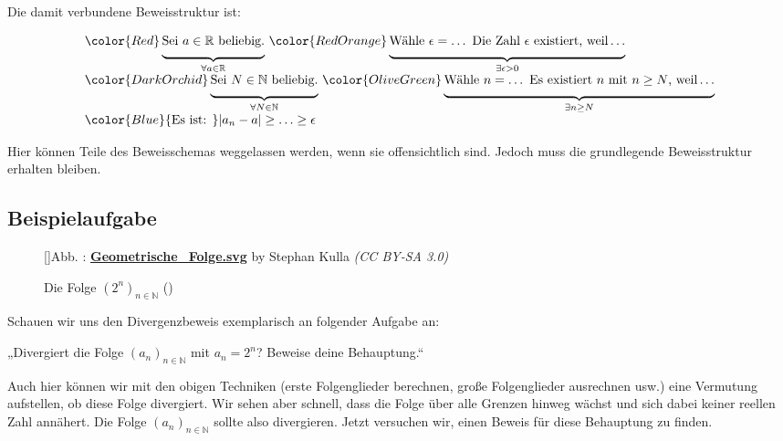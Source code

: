 \documentclass[fontsize=9pt,
               parskip=half-,
               DIV=14,
               listof=chapterentry,
               tocflat]{scrbook}
\newcounter{imagelabel}
\begin{document}
Die damit verbundene Beweisstruktur ist:

\begin{align*}
{\begin{array}{l}{\color {Red}\underbrace {{\underset {}{}}{\text{Sei }}a\in \mathbb {R} {\text{ beliebig.}}} _{\forall a\in \mathbb {R} }}\ {\color {RedOrange}\underbrace {{\underset {}{}}{\text{Wähle }}\epsilon =\ldots {\text{ Die Zahl }}\epsilon {\text{ existiert, weil}}\ldots } _{\exists \epsilon >0}}\\{\color {DarkOrchid}\underbrace {{\underset {}{}}{\text{Sei }}N\in \mathbb {N} {\text{ beliebig.}}} _{\forall N\in \mathbb {N} }}\ {\color {OliveGreen}\underbrace {{\underset {}{}}{\text{Wähle }}n=\ldots {\text{ Es existiert }}n{\text{ mit }}n\geq N{\text{, weil}}\ldots } _{\exists n\geq N}}\\{\color {Blue}{\text{Es ist: }}|a_{n}-a|\geq \ldots \geq \epsilon }\end{array}}
\end{align*}

Hier können Teile des Beweisschemas weggelassen werden, wenn sie offensichtlich sind. Jedoch muss die grundlegende Beweisstruktur erhalten bleiben.

\subsection{Beispielaufgabe}

\begin{figure}[h]
\vspace{\baselineskip}
[]{Abb. : \protect\href{https://commons.wikimedia.org/wiki/File:Geometrische_Folge.svg}{\textbf{Geometrische\allowbreak\_Folge.svg}} by Stephan Kulla \textit{(CC BY-SA 3.0)}}\centering
{}
\caption*{Die Folge $(2^{n})_{n\in \mathbb {N} }$ ()}
\end{figure}
Schauen wir uns den Divergenzbeweis exemplarisch an folgender Aufgabe an:

\begin{importantparagraph*}
„Divergiert die Folge $(a_{n})_{n\in \mathbb {N} }$ mit $a_{n}=2^{n}$? Beweise deine Behauptung.“

\end{importantparagraph*}

Auch hier können wir mit den obigen Techniken (erste Folgenglieder berechnen, große Folgenglieder ausrechnen usw.) eine Vermutung aufstellen, ob diese Folge divergiert. Wir sehen aber schnell, dass die Folge über alle Grenzen hinweg wächst und sich dabei keiner reellen Zahl annähert. Die Folge $(a_{n})_{n\in \mathbb {N} }$ sollte also divergieren. Jetzt versuchen wir, einen Beweis für diese Behauptung zu finden.
\end{document}
